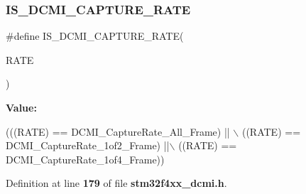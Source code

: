 \subsubsection{I\+S\+\_\+\+D\+C\+M\+I\+\_\+\+C\+A\+P\+T\+U\+R\+E\+\_\+\+R\+A\+TE}
{\footnotesize\ttfamily \#define I\+S\+\_\+\+D\+C\+M\+I\+\_\+\+C\+A\+P\+T\+U\+R\+E\+\_\+\+R\+A\+TE(\begin{DoxyParamCaption}\item[{}]{R\+A\+TE }\end{DoxyParamCaption})}

{\bfseries Value\+:}
\begin{DoxyCode}
(((RATE) == DCMI_CaptureRate_All_Frame) || \(\backslash\)
                                    ((RATE) == DCMI_CaptureRate_1of2_Frame) ||\(\backslash\)
                                    ((RATE) == DCMI_CaptureRate_1of4_Frame))
\end{DoxyCode}


Definition at line \textbf{ 179} of file \textbf{ stm32f4xx\+\_\+dcmi.\+h}.

